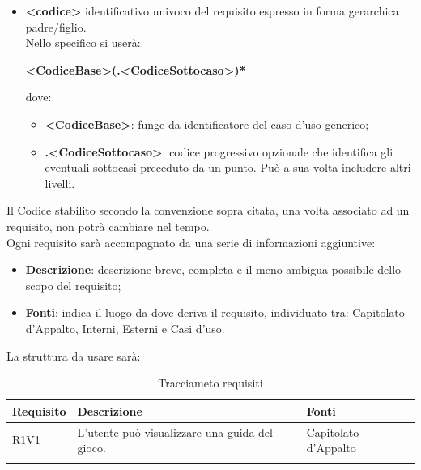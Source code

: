 \begin{itemize}
                        
                    \item\textbf{<codice>} identificativo univoco del requisito espresso in forma gerarchica padre/figlio. \\
                        Nello specifico si userà:\\
                        \begin{center}
                            \textbf{<CodiceBase>(.<CodiceSottocaso>)*}
                        \end{center}
                        dove:
                        \begin{itemize}
                            \item\textbf{<CodiceBase>}: funge da identificatore del caso d’uso generico;
                            \item\textbf{.<CodiceSottocaso>}: codice progressivo opzionale che identifica gli eventuali sottocasi preceduto da un punto. Può a sua volta includere altri livelli.
                        \end{itemize}
                \end{itemize}
                Il Codice stabilito secondo la convenzione sopra citata, una volta associato ad un requisito, non potrà cambiare nel tempo. \\
                Ogni requisito sarà accompagnato da una serie di informazioni aggiuntive:\\
                \begin{itemize}
                    \item\textbf{Descrizione}: descrizione breve, completa e il meno ambigua possibile dello scopo del requisito;
                    \item\textbf{Fonti}: indica il luogo da dove deriva il requisito, individuato tra: Capitolato d’Appalto,  Interni,  Esterni e Casi d’uso.
                \end{itemize}
                La struttura da usare sarà:
                \begin{center}
                    \begin{longtable}{|p{4.5cm}|p{4.5cm}|p{4.5cm}|}
                        \hline
                        \rowcolor{lighter-grayer}
                        \textbf{Requisito} & \textbf{Descrizione} & \textbf{Fonti}\\
                        \hline
                        \endfirsthead
                        R1V1 & L’utente può visualizzare una guida del gioco. & Capitolato d'Appalto  \\
                        \caption{Tracciameto requisiti}
                        \label{Tracciamento requisiti}
                    \end{longtable}
                \end{center}
